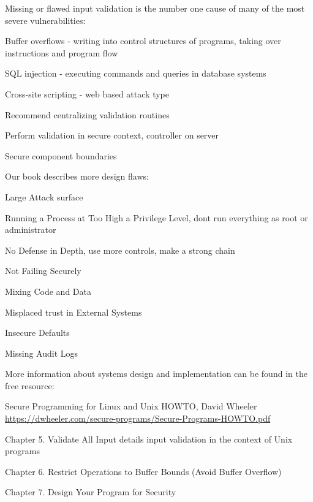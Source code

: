 \documentclass[Screen16to9,17pt]{foils}
\begin{document}

Missing or flawed input validation is the number one cause of many of the most severe vulnerabilities:
\begin{list2}
\item Buffer overflows - writing into control structures of programs, taking over instructions and program flow
\item SQL injection - executing commands and queries in database systems
\item Cross-site scripting - web based attack type
\item Recommend centralizing validation routines
\item Perform validation in secure context, controller on server
\item Secure component boundaries
\end{list2}


Our book describes more design flaws:
\begin{list2}
\item Large Attack surface
\item Running a Process at Too High a Privilege Level, dont run everything as root or administrator
\item No Defense in Depth, use more controls, make a strong chain
\item Not Failing Securely
\item Mixing Code and Data
\item Misplaced trust in External Systems
\item Insecure Defaults
\item Missing Audit Logs
\end{list2}


\begin{list2}
\item More information about systems design and implementation can be found in the free resource:
\item Secure Programming for Linux and Unix HOWTO, David Wheeler\\
\url{https://dwheeler.com/secure-programs/Secure-Programs-HOWTO.pdf}
\item Chapter 5. Validate All Input details input validation in the context of Unix programs
\item Chapter 6. Restrict Operations to Buffer Bounds (Avoid Buffer Overflow)
\item Chapter 7. Design Your Program for Security
\end{list2}
\end{document}
